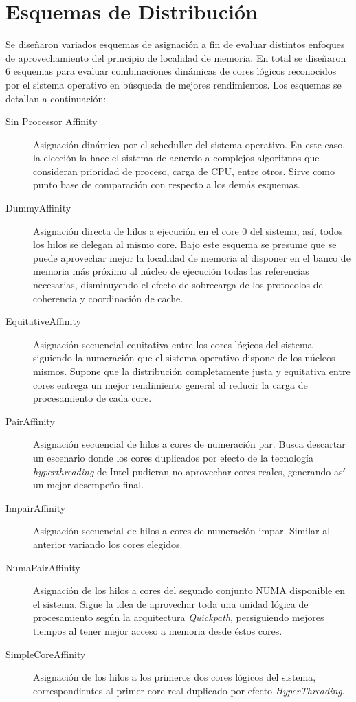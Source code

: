 \section{Esquemas de Distribución}
Se diseñaron variados esquemas de asignación a fin de evaluar distintos enfoques de aprovechamiento del principio de localidad de memoria. En total se diseñaron 6 esquemas para evaluar combinaciones dinámicas de cores lógicos reconocidos por el sistema operativo en búsqueda de mejores rendimientos. Los esquemas se detallan a continuación:
\begin{description}
\item[Sin Processor Affinity] Asignación dinámica por el scheduller del sistema operativo. En este caso, la elección la hace el sistema de acuerdo a complejos algoritmos que consideran prioridad de proceso, carga de CPU, entre otros. Sirve como punto base de comparación con respecto a los demás esquemas.
\item[DummyAffinity] Asignación directa de hilos a ejecución en el core 0 del sistema, así, todos los hilos se delegan al mismo core. Bajo este esquema se presume que se puede aprovechar mejor la localidad de memoria al disponer en el banco de memoria más próximo al núcleo de ejecución todas las referencias necesarias, disminuyendo el efecto de sobrecarga de los protocolos de coherencia y coordinación de cache.
\item[EquitativeAffinity] Asignación secuencial equitativa entre los cores lógicos del sistema siguiendo la numeración que el sistema operativo dispone de los núcleos mismos. Supone que la distribución completamente justa y equitativa entre cores entrega un mejor rendimiento general al reducir la carga de procesamiento de cada core.
\item[PairAffinity] Asignación secuencial de hilos a cores de numeración par. Busca descartar un escenario donde los cores duplicados por efecto de la tecnología \emph{hyperthreading} de Intel pudieran no aprovechar cores reales, generando así un mejor desempeño final.
\item[ImpairAffinity] Asignación secuencial de hilos a cores de numeración impar. Similar al anterior variando los cores elegidos.
\item[NumaPairAffinity] Asignación de los hilos a cores del segundo conjunto NUMA disponible en el sistema. Sigue la idea de aprovechar toda una unidad lógica de procesamiento según la arquitectura \emph{Quickpath}, persiguiendo mejores tiempos al tener mejor acceso a memoria desde éstos cores.
\item[SimpleCoreAffinity] Asignación de los hilos a los primeros dos cores lógicos del sistema, correspondientes al primer core real duplicado por efecto \emph{HyperThreading}.
\end{description}

